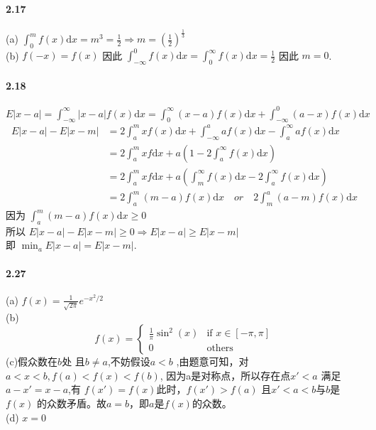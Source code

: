 \documentclass[12pt,a4paper]{ctexart}
\begin{document}
\author{曾柯又  2013012266 基32}
\paragraph{2.17} (a) $\displaystyle \int_{0}^{m}f(x)\mathrm{d}x = m^3 = \frac{1}{2} \Rightarrow  m = (\frac{1}{2})^{\frac{1}{3}}$ \\
(b) $f(-x) = f(x)$ 因此 $\displaystyle \int_{-\infty}^{0}f(x)\mathrm{d}x = \int_{0}^{\infty}f(x)\mathrm{d}x = \frac{1}{2}$ 因此 $m = 0$.

\paragraph{2.18}$\displaystyle E|x-a| = \int_{-\infty}^{\infty}|x-a|f(x)\mathrm{d}x = \int_{0}^{\infty}(x-a)f(x)\mathrm{d}x + \int_{-\infty}^{0}(a-x)f(x)\mathrm{d}x$
\begin{equation*}
\begin{split}
 E|x-a| - E|x-m| 
& = 2\int_{a}^{m}xf(x)\mathrm{d}x + \int_{-\infty}^{a}af(x)\mathrm{d}x - \int_{a}^{\infty}af(x)\mathrm{d}x\\
& = 2\int_{a}^{m}xf\mathrm{d}x+a \left (1 - 2\int_{a}^{\infty}f(x)\mathrm{d}x \right )\\
& = 2\int_{a}^{m}xf\mathrm{d}x + a\left (\int_{m}^{\infty}f(x)\mathrm{d}x - 2\int_{a}^{\infty}f(x)\mathrm{d}x \right )\\
& = 2\int_{a}^{m}(m-a)f(x)\mathrm{d}x \quad or \quad 2\int_{m}^{a}(a-m)f(x)\mathrm{d}x
\end{split}
\end{equation*}
因为 $\displaystyle\int_{a}^{m}(m-a)f(x)\mathrm{d}x \geq 0 $\\
所以 $\displaystyle E|x -a| - E|x -m| \geq 0 \Rightarrow E|x-a| \geq E|x-m|$ \\
即 $\displaystyle \min_{a}E|x-a| = E|x-m|.$
\paragraph{2.27}(a) $f(x) = \frac{1}{\sqrt{2\pi}}e^{-{x^2}/2}$\\
(b) \[
 f(x) =
  \begin{cases}
   \frac{1}{\pi}\sin^2(x) & \text{if } x \in [-\pi,\pi] \\
   0       & \text{others}
  \end{cases}
\]
(c)假众数在$b$处 且$b\neq a$,不妨假设$a<b$ ,由题意可知，对$a<x<b , f(a)<f(x)<f(b)$, 因为a是对称点，所以存在点$x' < a$ 满足 $a - x' =x -a$,有 $f(x') = f(x)$此时，$f(x') > f(a)$ 且$x' < a < b$与$b$是$f(x)$ 的众数矛盾。故$a = b$，即$a$是$f(x)$的众数。\\
(d) $ x = 0$
\end{document}
